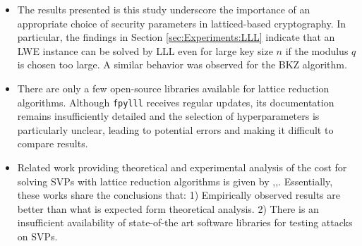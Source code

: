\begin{itemize}
    \item The results presented is this study underscore the importance of an appropriate choice of security parameters in latticed-based cryptography. In particular, the findings in Section \ref{sec:Experiments:LLL} indicate that an LWE instance can be solved by LLL even for large key size $n$ if the modulus $q$ is chosen too large. A similar behavior was observed for the BKZ algorithm.

    \item There are only a few open-source libraries available for lattice reduction algorithms. Although \texttt{fpylll} receives regular updates, its documentation remains insufficiently detailed and the selection of hyperparameters is particularly unclear, leading to potential errors and making it difficult to compare results. 

    \item Related work providing theoretical and experimental analysis of the cost for solving SVPs with lattice reduction algorithms is given by \cite{Albrecht17},\cite{Laine15},\cite{Schneider10}.  Essentially, these works share the conclusions that: 1) Empirically observed results are better than what is expected form theoretical analysis. 2) There is an insufficient availability of state-of-the art software libraries for testing attacks on SVPs. 
\end{itemize}

  



